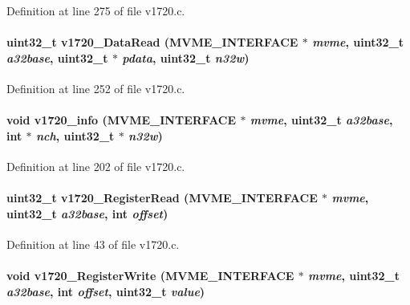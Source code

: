 Definition at line 275 of file v1720.c.
\paragraph[{v1720\_\-DataRead}]{\setlength{\rightskip}{0pt plus 5cm}uint32\_\-t v1720\_\-DataRead ({\bf MVME\_\-INTERFACE} $\ast$ {\em mvme}, \/  uint32\_\-t {\em a32base}, \/  uint32\_\-t $\ast$ {\em pdata}, \/  uint32\_\-t {\em n32w})}\hfill\label{v1720drv_8h_ae14ed3f1d1f8032d4f65d99ddd56f0d0}


Definition at line 252 of file v1720.c.
\paragraph[{v1720\_\-info}]{\setlength{\rightskip}{0pt plus 5cm}void v1720\_\-info ({\bf MVME\_\-INTERFACE} $\ast$ {\em mvme}, \/  uint32\_\-t {\em a32base}, \/  int $\ast$ {\em nch}, \/  uint32\_\-t $\ast$ {\em n32w})}\hfill\label{v1720drv_8h_ae7d9ddfc71d5914f3a24af3bf3ba9ea8}


Definition at line 202 of file v1720.c.
\paragraph[{v1720\_\-RegisterRead}]{\setlength{\rightskip}{0pt plus 5cm}uint32\_\-t v1720\_\-RegisterRead ({\bf MVME\_\-INTERFACE} $\ast$ {\em mvme}, \/  uint32\_\-t {\em a32base}, \/  int {\em offset})}\hfill\label{v1720drv_8h_a0d8eebd5a8c357199dbf6f33df771ace}


Definition at line 43 of file v1720.c.
\paragraph[{v1720\_\-RegisterWrite}]{\setlength{\rightskip}{0pt plus 5cm}void v1720\_\-RegisterWrite ({\bf MVME\_\-INTERFACE} $\ast$ {\em mvme}, \/  uint32\_\-t {\em a32base}, \/  int {\em offset}, \/  uint32\_\-t {\em value})}\hfill\label{v1720drv_8h_aced8c277fc415c26ce7a222a4cfcc49c}


